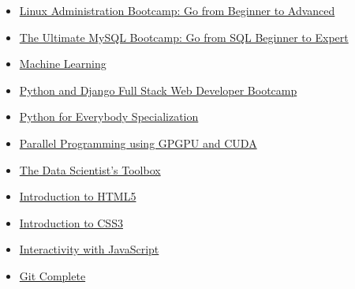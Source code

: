 \documentclass[11pt,a4paper,sans]{moderncv} %
\begin{document}
\begin{multicols}{2}
\begin{itemize}
			\item {} \href{https://www.udemy.com/course/linux-administration-bootcamp/}{Linux Administration Bootcamp: Go from Beginner to Advanced}
			
			\item {} \href{https://www.udemy.com/course/the-ultimate-mysql-bootcamp-go-from-sql-beginner-to-expert/}{The Ultimate MySQL Bootcamp: Go from SQL Beginner to Expert}
			

			\item {}  \href{https://www.coursera.org/learn/machine-learning}{Machine Learning}
			
			\item {}
		    \href{https://www.udemy.com/course/python-and-django-full-stack-web-developer-bootcamp/learn/lecture/6550402?start=0#overview}{Python and Django Full Stack Web Developer Bootcamp}
			
			\item {} \href{https://www.coursera.org/specializations/python}{Python for Everybody Specialization}
			
			\item  {\large{}} \href{https://www.udemy.com/introduction-to-parallel-programming-using-gpgpu-and-cuda/learn/v4/overview}{Parallel Programming using GPGPU and CUDA}
			
			\item  {}  \href{https://www.coursera.org/learn/data-scientists-tools}{The Data Scientist's Toolbox}
			
			\item  {} \href{https://www.coursera.org/learn/html}{Introduction to HTML5} 
			
			\item  {} \href{https://www.coursera.org/learn/introcss}{Introduction to CSS3} 
			
			\item  {} \href{https://www.coursera.org/learn/javascript}{Interactivity with JavaScript}  
			
			\item  {\large{}} \href{https://www.udemy.com/git-complete/learn/v4/overview}{Git Complete}
			
		\end{itemize}
	\end{multicols}
\end{document}
